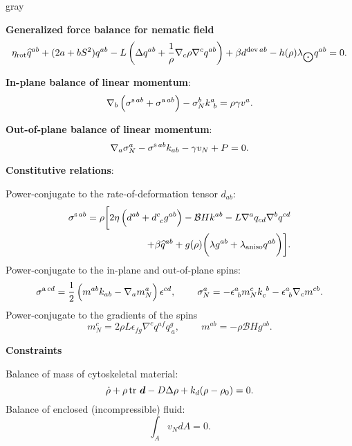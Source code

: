 \begin{center}
	\begin{mybox}{gray}{}
		
		\textbf{Generalized force balance for nematic field}
		\begin{equation}  \label{87_II}
			\eta_{\text{rot}} \widehat{q}^{ab} +( 2a+bS^2 ) q^{ab} -  L\left(\Delta q^{ab} + \frac{1}{\rho} \nabla_c \rho \nabla^c q^{ab}\right)  +\beta  d^{\textup{dev} \, ab}  - h (\rho)\lambda_{\bigodot} q^{ab} = 0.
		\end{equation}
		
		\textbf{In-plane balance of linear momentum}:
		\begin{equation} \label{80_II}
			\nabla_b \left(\sigma^{\textup{s} \, ab} + \sigma^{\textup{a} \, ab }   \right) -\sigma_N^b k^a_{~ b}=\rho \gamma  v^a.
		\end{equation}
		
		\textbf{Out-of-plane  balance of linear momentum}:
		\begin{equation} \label{83_II}
			\nabla_a \sigma^a_N - \sigma^{\textup{s}  \, ab} k_{ab} - \gamma v_N  + P = 0.
		\end{equation}
		
		\textbf{Constitutive relations}:
		
		
		Power-conjugate to the rate-of-deformation tensor $d_{ab}$:
		\begin{align} \label{81_II}
			\sigma^{\textup{s} \, ab}  = \rho \bigg[  2\eta \left(d^{ab} +   d_{~c}^c g^{ab}\right)  -\mathcal{B}Hk^{ab}  -L\nabla^a q_{cd} \nabla^b q^{cd}   & \\ + \beta \widehat{q}^{ab}   +  g(\rho)\bigg(\lambda  g^{ab} +    \lambda_{\rm aniso} q^{ab} \bigg) \bigg]. \nonumber
		\end{align}
		Power-conjugate to the in-plane and out-of-plane spins:
		\begin{equation} 
			\sigma^{\textup{a} \, cd } = \frac{1}{2}\left(m^{ab} k_{ab} - \nabla_a m_N^a\right)\epsilon^{cd},
			\;\;\;\;\;\;\;\;
			\sigma_{N}^a  =- \epsilon^a_{~b} m_N^{c} k^{~b}_{c} - \epsilon^a_{~b}\nabla_c m^{cb}.
		\end{equation}
		Power-conjugate to the gradients of the spins
		\begin{equation}  \label{86_II}
			m_{N}^c= 2\rho L \epsilon_{fg} \nabla^c q^{af} q^g_{~a},
			\;\;\;\;\;\;\;\; m^{ab} = -\rho \mathcal{B} Hg^{ab}.
		\end{equation}
		
		\textbf{Constraints}
		
		Balance of mass of cytoskeletal material:
		\begin{equation}  \label{89_II}
			\dot\rho  + \rho \, \textup{tr }\bm{d} - D \Delta \rho + k_d(\rho-\rho_0) = 0.
		\end{equation}
		Balance of enclosed (incompressible) fluid:
		\begin{equation}  \label{89_II_}
			{\int_A}  v_N d A = 0.
		\end{equation}
	\end{mybox} \label{Box2}
\end{center}


